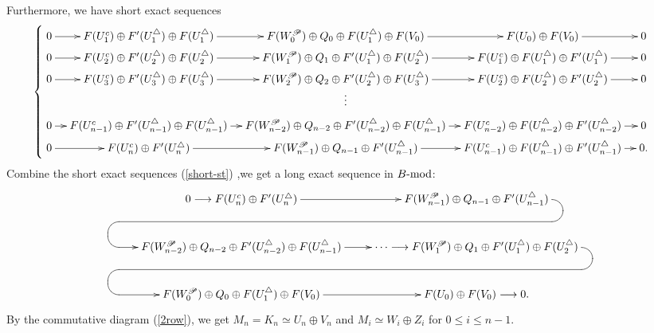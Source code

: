 \documentclass[12pt]{article}
\numberwithin{equation}{section}
\theoremstyle{definition}
\newcommand{\modcat}{\ensuremath{\mbox{{\rm -mod}}}}
\newcommand{\lra}{\longrightarrow}
\begin{document}
Furthermore, we have short exact sequences
{\footnotesize
\begin{equation}\label{short-st}
\begin{cases}
\xymatrix@C=1em@R=0.1em{
0\ar[r]
& F(U_{1}^{c})\oplus F'(U_{1}^{\triangle})\oplus F(U_{1}^{\triangle})\ar[r]
& F(W^{\mathscr{P}}_0)\oplus Q_0\oplus F(U_{1}^{\triangle})\oplus F(V_0)\ar[r]
& F(U_0)\oplus F(V_0)\ar[r]
&0\\
0\ar[r]
& F(U_{2}^{c})\oplus F'(U_{2}^{\triangle})\oplus F(U_{2}^{\triangle})\ar[r]
& F(W^{\mathscr{P}}_1)\oplus Q_1\oplus F'(U_{1}^{\triangle})\oplus F(U_{2}^{\triangle})\ar[r]
& F(U_{1}^{c})\oplus F(U_{1}^{\triangle})\oplus F'(U_{1}^{\triangle})\ar[r]
&0\\
0\ar[r]
& F(U_{3}^{c})\oplus F'(U_{3}^{\triangle})\oplus F(U_{3}^{\triangle})\ar[r]
& F(W^{\mathscr{P}}_2)\oplus Q_2\oplus F'(U_{2}^{\triangle})\oplus F(U_{3}^{\triangle})\ar[r]
& F(U_{2}^{c})\oplus F(U_{2}^{\triangle})\oplus F'(U_{2}^{\triangle})\ar[r]
&0\\
&&\vdots&&\\
0\ar[r]
& F(U_{n-1}^{c})\oplus F'(U_{n-1}^{\triangle})\oplus F(U_{n-1}^{\triangle})\ar[r]
& F(W^{\mathscr{P}}_{n-2})\oplus Q_{n-2}\oplus F'(U_{n-2}^{\triangle})\oplus F(U_{n-1}^{\triangle})\ar[r]
& F(U_{n-2}^{c})\oplus F(U_{n-2}^{\triangle})\oplus F'(U_{n-2}^{\triangle})\ar[r]
&0\\
0\ar[r]
& F(U_{n}^{c})\oplus F'(U_{n}^{\triangle})\ar[r]
& F(W^{\mathscr{P}}_{n-1})\oplus Q_{n-1}\oplus F'(U_{n-1}^{\triangle})\ar[r]
& F(U_{n-1}^{c})\oplus F(U_{n-1}^{\triangle})\oplus F'(U_{n-1}^{\triangle})\ar[r]
&0.}
\end{cases}
\end{equation}}
Combine the short exact sequences (\ref{short-st}) ,we get a long exact sequence in $B\modcat$:
\begin{align}\label{long-st}
\xymatrix{
&0\lra F(U_{n}^{c})\oplus F'(U_{n}^{\triangle}) \ar[r]
& F(W^{\mathscr{P}}_{n-1})\oplus Q_{n-1}\oplus F'(U_{n-1}^{\triangle}) \ar `r[d] `[l] `[lld] `[dl] [dl]\\
& F(W^{\mathscr{P}}_{n-2})\oplus Q_{n-2}\oplus F'(U_{n-2}^{\triangle})\oplus F(U_{n-1}^{\triangle}) \ar[r]
& \cdots \lra F(W^{\mathscr{P}}_1)\oplus Q_1\oplus F'(U_{1}^{\triangle})\oplus F(U_{2}^{\triangle})
\ar `r[d] `[l] `[lld] `[dl] [dl]\\
& F(W^{\mathscr{P}}_0)\oplus Q_0\oplus F(U_{1}^{\triangle})\oplus F(V_0) \ar[r]
&  F(U_0)\oplus F(V_0)  \lra 0.
}\end{align}
By the commutative diagram (\ref{2row}), we get $M_n=K_n\simeq U_n\oplus V_n$ and $M_i\simeq W_i\oplus Z_i$ for $0\le i\le n-1$.
\end{document}

